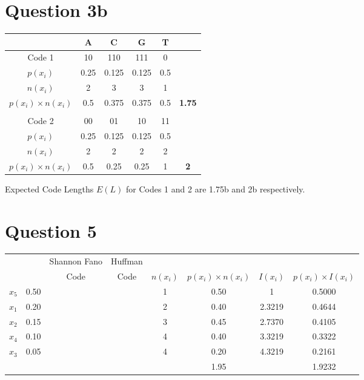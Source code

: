 \documentclass[a4paper,12pt]{article}
\begin{document}
\section*{Question 3b}
\begin{center}
\begin{tabular}{|c|c|c|c|c|c|}
\hline 
	&	A	&	C	&	G	&	T	&		\\ \hline	
Code 1	&	10	&	110	&	111	&	0	&		\\ \hline	
$p(x_i)$	&	0.25	&	0.125	&	0.125	&	0.5	&		\\ \hline	
$n(x_i)$	&	2	&	3	&	3	&	1	&		\\ \hline	
$p(x_i) \times n(x_i)$	&	0.5	&	0.375	&	0.375	&	0.5	&	\textbf{1.75}	\\ \hline	
	&		&		&		&		&		\\ \hline	\hline
Code 2	&	00	&	01	&	10	&	11	&		\\ \hline	
$p(x_i)$	&	0.25	&	0.125	&	0.125	&	0.5	&		\\ \hline	
$n(x_i)$	&	2	&	2	&	2	&	2	&		\\ \hline	
$p(x_i) \times n(x_i)$	&	0.5	&	0.25	&	0.25	&	1	&	\textbf{2}	\\ \hline	
\end{tabular} 
\end{center}

Expected Code Lengths $E(L)$ for Codes 1 and 2 are 1.75b and 2b respectively.

\section*{Question 5}
\begin{center}
\begin{tabular}{|c|c|c|c|c|c|c|c|}
\hline	&		&	Shannon Fano	&	Huffman	&		&		&		&	\\	
	&		&	 Code	&	Code	&	$n(x_i)$	&	$p(x_i) \times n(x_i)$	&	$I(x_i)$	&	$p(x_i) \times I(x_i)$	\\ \hline
$x_5$	&	0.50	&		&		&	1	&	0.50	&	1	&	0.5000	\\ \hline
$x_1$	&	0.20	&		&		&	2	&	0.40	&	2.3219	&	0.4644	\\ \hline
$x_2$	&	0.15	&		&		&	3	&	0.45	&	2.7370	&	0.4105	\\ \hline
$x_4$	&	0.10	&		&		&	4	&	0.40	&	3.3219	&	0.3322	\\ \hline
$x_3$	&	0.05	&		&		&	4	&	0.20	&	4.3219	&	0.2161	\\ \hline
	&		&		&		&		&	1.95	&		&	1.9232	\\ \hline
 
\end{tabular} 
\end{center}
\end{document}
